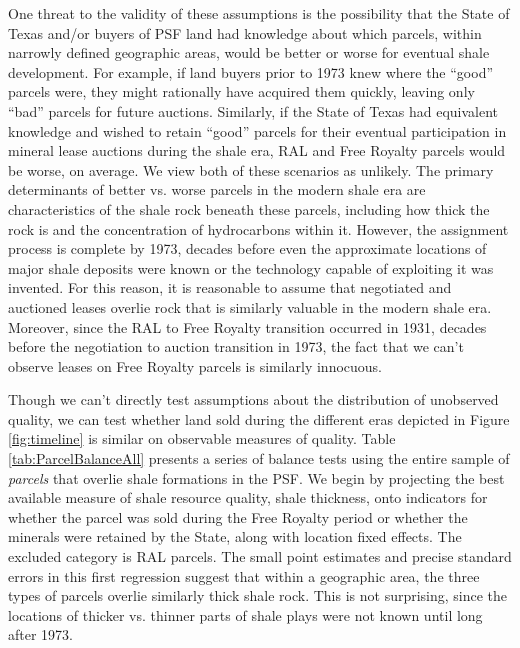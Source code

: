 \documentclass[12pt]{article}
\begin{document}
One threat to the validity of these assumptions is the possibility that the State of Texas and/or buyers of PSF land had knowledge about which parcels, within narrowly defined geographic areas, would be better or worse for eventual shale development.  For example, if land buyers prior to 1973 knew where the ``good'' parcels were, they might rationally have acquired them quickly, leaving only ``bad'' parcels for future auctions.  Similarly, if the State of Texas had equivalent knowledge and wished to retain ``good'' parcels for their eventual participation in mineral lease auctions during the shale era, RAL and Free Royalty parcels would be worse, on average. We view both of these scenarios as unlikely. The primary determinants of better vs. worse parcels in the modern shale era are characteristics of the shale rock beneath these parcels, including how thick the rock is and the concentration of hydrocarbons within it.  However, the assignment process is complete by 1973, decades before even the approximate locations of major shale deposits were known or the technology capable of exploiting it was invented.  For this reason, it is reasonable to assume that negotiated and auctioned leases overlie rock that is similarly valuable in the modern shale era.  Moreover, since the RAL to Free Royalty transition occurred in 1931, decades before the negotiation to auction transition in 1973, the fact that we can't observe leases on Free Royalty parcels is similarly innocuous.

Though we can't directly test assumptions about the distribution of unobserved quality, we can test whether land sold during the different eras depicted in Figure \ref{fig:timeline} is similar on observable measures of quality. Table \ref{tab:ParcelBalanceAll} presents a series of balance tests using the entire sample of \emph{parcels} that overlie shale formations in the PSF.  We begin by projecting the best available measure of shale resource quality, shale thickness, onto indicators for whether the parcel was sold during the Free Royalty period or whether the minerals were retained by the State, along with location fixed effects.  The excluded category is RAL parcels.  The small point estimates and precise standard errors in this first regression suggest that within a geographic area, the three types of parcels overlie similarly thick shale rock. This is not surprising, since the locations of thicker vs. thinner parts of shale plays were not known until long after 1973.
\end{document}
